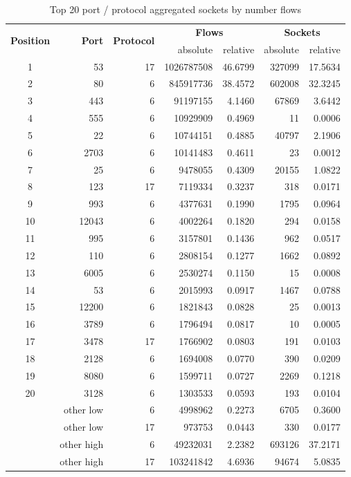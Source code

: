 \begin{table}
	[ht] \centering 
	\begin{tabular}{|c|r|r|r|r|r|r|} 
		\hline 
		\multirow{2}{*}{\textbf{Position}} & \multirow{2}{*}{\textbf{Port}} & \multirow{2}{*}{\textbf{Protocol}} & \multicolumn{2}{|c|}{\textbf{Flows}} & \multicolumn{2}{|c|}{\textbf{Sockets}} \\
		\cline{4-7} & & &absolute & relative & absolute & relative \\
		\hline \hline 1 & 53 & 17 & 1026787508 & 46.6799 & 327099 & 17.5634 \\
		\hline 2 & 80 & 6 & 845917736 & 38.4572 & 602008 & 32.3245 \\
		\hline 3 & 443 & 6 & 91197155 & 4.1460 & 67869 & 3.6442 \\
		\hline 4 & 555 & 6 & 10929909 & 0.4969 & 11 & 0.0006 \\
		\hline 5 & 22 & 6 & 10744151 & 0.4885 & 40797 & 2.1906 \\
		\hline 6 & 2703 & 6 & 10141483 & 0.4611 & 23 & 0.0012 \\
		\hline 7 & 25 & 6 & 9478055 & 0.4309 & 20155 & 1.0822 \\
		\hline 8 & 123 & 17 & 7119334 & 0.3237 & 318 & 0.0171 \\
		\hline 9 & 993 & 6 & 4377631 & 0.1990 & 1795 & 0.0964 \\
		\hline 10 & 12043 & 6 & 4002264 & 0.1820 & 294 & 0.0158 \\
		\hline 11 & 995 & 6 & 3157801 & 0.1436 & 962 & 0.0517 \\
		\hline 12 & 110 & 6 & 2808154& 0.1277 & 1662 & 0.0892 \\
		\hline 13 & 6005 & 6 & 2530274 & 0.1150 & 15 & 0.0008 \\
		\hline 14 & 53 & 6 & 2015993 & 0.0917 & 1467 & 0.0788 \\
		\hline 15 & 12200 & 6 & 1821843 & 0.0828 & 25 & 0.0013 \\
		\hline 16 & 3789 & 6 & 1796494 & 0.0817 & 10 & 0.0005 \\
		\hline 17 & 3478 & 17 & 1766902 & 0.0803 & 191 & 0.0103 \\
		\hline 18 & 2128 & 6 & 1694008 & 0.0770 & 390 & 0.0209 \\
		\hline 19 & 8080 & 6 & 1599711 & 0.0727 & 2269 & 0.1218 \\
		\hline 20 & 3128 & 6 & 1303533 & 0.0593 & 193 & 0.0104 \\
		\hline & other low & 6 & 4998962 & 0.2273 & 6705 & 0.3600 \\
		\hline & other low & 17 & 973753 & 0.0443 & 330 & 0.0177 \\
		\hline & other high & 6 & 49232031 & 2.2382 & 693126 & 37.2171 \\
		\hline & other high & 17 & 103241842 & 4.6936 & 94674 & 5.0835 \\
		\hline 
	\end{tabular}
	\caption{Top 20 port / protocol aggregated sockets by number flows} 
	\label{tab:top20_ports} 
\end{table}
